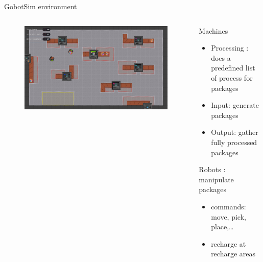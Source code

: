 \begin{frame}{GobotSim environment}
\begin{columns}
\begin{column}{0.4\textwidth}
    \begin{figure}[tp]
        \includegraphics[width=\linewidth]{images/gobot-rae.png}
    \end{figure}
\end{column}
\begin{column}{0.5\textwidth}
    Machines
    \begin{itemize}
        \item Processing : does a predefined list of process for packages
        \item Input: generate packages
        \item Output: gather fully processed packages
    \end{itemize}
    Robots : manipulate packages
    \begin{itemize}
        \item commands: move, pick, place,\dots
        \item recharge at recharge areas
    \end{itemize}
\end{column}
\end{columns}
\end{frame}

